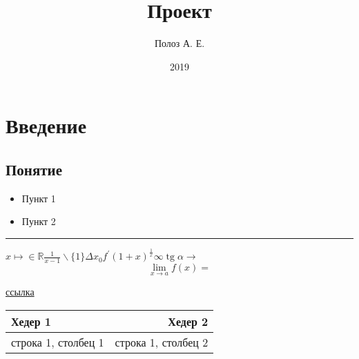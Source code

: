 \documentclass{article}
\title{Проект}
\author{Полоз А. Е.}
\date{2019}
\DeclareMathOperator{\tg}{tg}
\begin{document}
	
\maketitle

\section{Введение}
\label{section:introduction}
\subsection{Понятие}
\begin{itemize}
	\item Пункт 1
	\item  Пункт 2
\end{itemize}

\noindent\rule{\textwidth}{1pt}

$x \mapsto \in \mathbb{R} \frac{1}{x-1} \backslash \{1\} \Delta x_0 f^\prime (1 + x)^\frac{1}{x} \infty \tg \alpha \rightarrow$ 
$$\lim_{x \to a} f(x) =$$

\hyperref[section:introduction]{ссылка}\\

\begin{tabular}{ | l | r | }
	\hline
	Хедер 1 & Хедер 2 \\ \hline
	строка 1, столбец 1 & строка 1, столбец 2 \\
	\hline
\end{tabular}

\newpage


\end{document}
